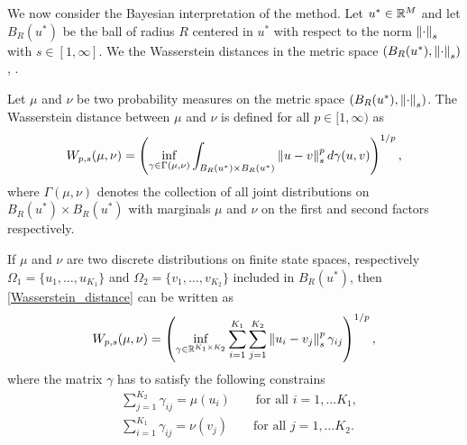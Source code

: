 \documentclass[10pt]{article}
\begin{document}
We now consider the Bayesian interpretation of the  method.  Let $u^* \in \mathbb{R}^M$ and let $B_R(u^*)$ be the ball of radius $R$ centered in $u^*$ with respect to the norm $\left\|\cdot\right\|_s$ with $s \in [1,\infty]$. We  the Wasserstein distances in the metric space $(B_R(u^*), \left\|\cdot\right\|_s)$, .

\begin{definition}
\label{Wasserstein_definition}
Let $\mu$ and $\nu$ be two probability measures on the metric space $(B_R(u^*), \left\|\cdot\right\|_s)$. The Wasserstein distance between $\mu$ and $\nu$ is defined for all $p \in [1, \infty)$ as
\begin{equation}
\label{Wasserstein_distance}
W_{p,s}(\mu, \nu) = \left ( \inf_{\gamma \in \Gamma(\mu, \nu)} \int_{B_R(u^*) \times B_R(u^*)} \left\|u - v\right\|_s^p d \gamma(u,v) \right )^{1/p},
\end{equation}
where $\Gamma(\mu, \nu)$ denotes the collection of all joint distributions on $B_R(u^*) \times B_R(u^*)$ with marginals $\mu$ and $\nu$ on the first and second factors respectively.
\end{definition}

\begin{remark}
If $\mu$ and $\nu$ are two discrete distributions on finite state spaces, respectively $\Omega_1 = \{ u_1, \dots, u_{K_1} \}$ and $\Omega_2 = \{ v_1, \dots, v_{K_2} \}$ included in $B_R(u^*)$, then \eqref{Wasserstein_distance} can be written as
\begin{equation}
\label{Wasserstein_distance_discrete}
W_{p,s}(\mu, \nu) = \left ( \inf_{\gamma \in \mathbb{R}^{K_1 \times K_2}} \sum_{i=1}^{K_1} \sum_{j=1}^{K_2} \left\|u_i - v_j\right\|_s^p \gamma_{ij} \right )^{1/p},
\end{equation}
where the matrix $\gamma$ has to satisfy the following constrains
\begin{align*}
& \sum_{j=1}^{K_2} \gamma_{ij} = \mu(u_i) \qquad \text{for all } i = 1, \dots K_1, \\
& \sum_{i=1}^{K_1} \gamma_{ij} = \nu(v_j) \qquad \text{for all } j = 1, \dots K_2.
\end{align*}
\end{remark}
\end{document}
